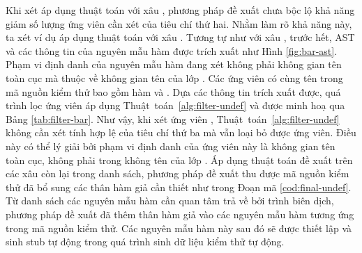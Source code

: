 Khi xét áp dụng thuật toán với xâu , phương pháp đề xuất chưa bộc lộ khả năng giảm số lượng ứng viên cần xét của tiêu chí thứ hai. Nhằm làm rõ khả năng này, ta xét ví dụ áp dụng thuật toán với xâu . Tương tự như với xâu , trước hết, AST và các thông tin của nguyên mẫu hàm được trích xuất như Hình \ref{fig:bar-ast}. Phạm vi định danh của nguyên mẫu hàm đang xét không phải không gian tên toàn cục mà thuộc về không gian tên của lớp . Các ứng viên có cùng tên  trong mã nguồn kiểm thử bao gồm hàm  và . Dựa các thông tin trích xuất được, quá trình lọc ứng viên áp dụng Thuật~toán~\ref{alg:filter-undef} và được minh hoạ qua Bảng \ref{tab:filter-bar}. Như vậy, khi xét ứng viên , Thuật~toán~\ref{alg:filter-undef} không cần xét tính hợp lệ của tiêu chí thứ ba mà vẫn loại bỏ được ứng viên. Điều này có thể lý giải bởi phạm vi định danh của ứng viên này là không gian tên toàn cục, không phải trong không tên của lớp . Áp dụng thuật toán đề xuất trên các xâu còn lại trong danh sách, phương pháp đề xuất thu được mã nguồn kiểm thử đã bổ sung các thân hàm giả cần thiết như trong Đoạn mã \ref{cod:final-undef}. Từ danh sách các nguyên mẫu hàm cần quan tâm trả về bởi trình biên dịch, phương pháp đề xuất đã thêm thân hàm giả  vào các nguyên mẫu hàm tương ứng trong mã nguồn kiểm thử. Các nguyên mẫu hàm này sau đó sẽ được thiết lập và sinh stub tự động trong quá trình sinh dữ liệu kiểm thử tự động.

